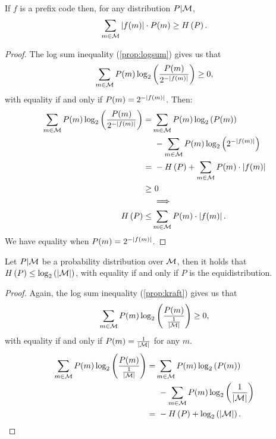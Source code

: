 \begin{prop} \label{prop:prefix-entropy-upper}
	If $f$ is a prefix code then, for any distribution $P|\mathcal{M}$,
	\begin{equation*}
		\sum_{m \in \mathcal{M}} \left|{f(m)}\right| \cdot P(m) \ge H\left({P}\right).
	\end{equation*}
\end{prop}

\begin{proof}
	The log sum inequality (\cref{prop:logsum}) gives us that
	\begin{equation*}
		\sum_{m \in \mathcal{M}} P(m) \log_2 \left( \frac{P(m)}{2^{-\left|{f(m)}\right|}} \right) \ge 0,
	\end{equation*}
	with equality if and only if $P(m) = 2^{-\left|{f(m)}\right|}$.
	Then:
	\begin{align*}
		\sum_{m \in \mathcal{M}} P(m) \log_2 \left( \frac{P(m)}{2^{-\left|{f(m)}\right|}} \right)
		= &
		\sum_{m \in \mathcal{M}} P(m) \log_2 \left( P(m) \right)
		\\
		&~-
		\sum_{m \in \mathcal{M}} P(m) \log_2 \left( 2^{-\left|{f(m)}\right|} \right)
		\\
		=
		&~-
		H\left({P}\right) + \sum_{m \in \mathcal{M}} P(m) \cdot \left|{f(m)}\right|
		\\
		\ge &~0
		\\
		&
		\implies
		\\
		H\left({P}\right)
		\le &
		\sum_{m \in \mathcal{M}} P(m) \cdot \left|{f(m)}\right|.
	\end{align*}
	We have equality when $P(m) = 2^{-\left|{f(m)}\right|}$.
\end{proof}

\begin{obs}
	Let $P|\mathcal{M}$ be a probability distribution over $\mathcal{M}$, then it holds that $H\left({P}\right) \le \log_2 \left( {\left|{\mathcal{M}}\right|} \right)$, with equality if and only if $P$ is the equidistribution.
\end{obs}

\begin{proof}
	Again, the log sum inequality (\cref{prop:kraft}) gives us that
	\begin{equation*}
		\sum_{m \in \mathcal{M}} P(m) \log_2 \left( \frac{P(m)}{\frac{1}{\left|{\mathcal{M}}\right|}} \right) \ge 0,
	\end{equation*}
	with equality if and only if $P(m) = \frac{1}{\left|{\mathcal{M}}\right|}$ for any $m$.
	\begin{align*}
		\sum_{m \in \mathcal{M}} P(m) \log_2 \left( \frac{P(m)}{\frac{1}{\left|{\mathcal{M}}\right|}} \right)
		= &
		\sum_{m \in \mathcal{M}} P(m) \log_2 \left( P(m) \right)
		\\
		&~-
		\sum_{m \in \mathcal{M}} P(m) \log_2 \left( \frac{1}{\left|{\mathcal{M}}\right|} \right)
		\\
		=
		&~- H\left({P}\right) + \log_2 \left( \left|{\mathcal{M}}\right| \right). \qedhere
	\end{align*}
\end{proof}

